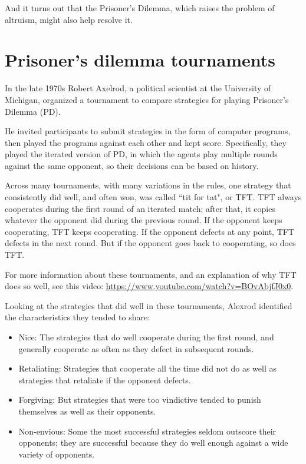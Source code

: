 \documentclass[12pt]{book}
\theoremstyle{exercise}
\begin{document}
And it turns out that the Prisoner's Dilemma, which raises the problem of altruism, might also help resolve it. 


\section{Prisoner's dilemma tournaments}

In the late 1970s Robert Axelrod, a political scientist at the University of Michigan, organized a tournament to compare strategies for playing Prisoner's Dilemma (PD).

He invited participants to submit strategies in the form of computer programs, then played the programs against each other and kept score.  Specifically, they played the iterated version of PD, in which the agents play multiple rounds against the same opponent, so their decisions can be based on history.

Across many tournaments, with many variations in the rules, one strategy that consistently did well, and often won, was called ``tit for tat", or TFT.  TFT always cooperates during the first round of an iterated match; after that, it copies whatever the opponent did during the previous round.  If the opponent keeps cooperating, TFT keeps cooperating.  If the opponent defects at any point, TFT defects in the next round.  But if the opponent goes back to cooperating, so does TFT.

For more information about these tournaments, and an explanation of why TFT does so well, see this video: \url{https://www.youtube.com/watch?v=BOvAbjfJ0x0}.

Looking at the strategies that did well in these tournaments, Alexrod identified the characteristics they tended to share:

\begin{itemize}

\item Nice: The strategies that do well cooperate during the first round, and generally cooperate as often as they defect in subsequent rounds.

\item Retaliating: Strategies that cooperate all the time did not do as well as strategies that retaliate if the opponent defects.

\item Forgiving: But strategies that were too vindictive tended to punish themselves as well as their opponents.

\item Non-envious: Some the most successful strategies seldom outscore their opponents; they are successful because they do well enough against a wide variety of opponents.
  
\end{itemize}
\end{document}
